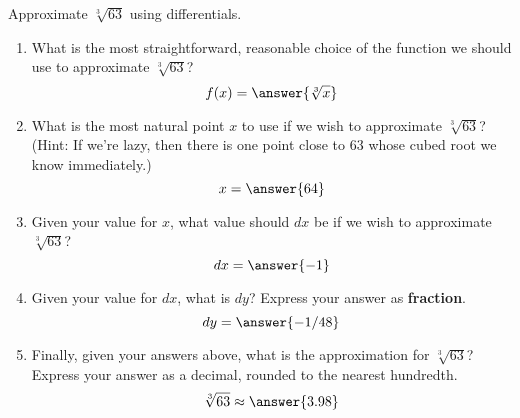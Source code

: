 \documentclass{ximera}
\author{Gregory Hartman \and Matthew Carr}
\begin{document}
\begin{exercise}




Approximate $\sqrt[3]{63}$ using differentials.
\begin{enumerate}
\item		What is the most straightforward, reasonable choice of the function we should use to approximate $\sqrt[3]{63}$?\[f(x)=\answer{\sqrt[3]{x}}\]
\item		What is the most natural point $x$ to use if we wish to approximate $\sqrt[3]{63}$? (Hint: If we're lazy, then there is one point close to $63$ whose cubed root we know immediately.) \[x=\answer{64}\]
\item		Given your value for $x$, what value should $dx$ be if we wish to approximate $\sqrt[3]{63}$? \[dx=\answer{-1}\]
\item		Given your value for $dx$, what is $dy$? Express your answer as \textbf{fraction}. \[dy=\answer{-1/48}\]
\item		Finally, given your answers above, what is the approximation for $\sqrt[3]{63}$? Express your answer as a decimal, rounded to the nearest hundredth. \[\sqrt[3]{63}\approx\answer{3.98}\]
\end{enumerate}


\end{exercise}
\end{document}
